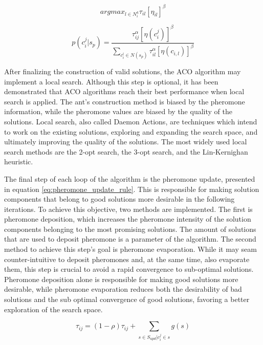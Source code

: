 \begin{equation} \label{eq:heuristic_rule}
	arg max_{l \in N_{i}^{k} } \tau_{il}[\eta_{il}]^{\beta}
\end{equation}


\begin{equation} \label{eq:ant_system_rule}
	p(c_{i}^{j}|s_{p}) = \frac{\tau_{ij}^{\alpha}  [\eta(c_{i}^{j})]^{\beta}}{\sum_{c_{i}^{l} \in N(s_{p})} \tau_{il}^{\alpha} [\eta(c_{i,l})]^{\beta}}
\end{equation}


After finalizing the construction of valid solutions, the ACO algorithm may implement a local search. Although this step is optional, it has been demonstrated that ACO algorithms reach their best performance when local search is applied. The ant's construction method is biased by the pheromone information, while the pheromone values are biased by the quality of the solutions. Local search, also called Daemon Actions, are techniques which intend to work on the existing solutions, exploring and expanding the search space, and ultimately improving the quality of the solutions. The most widely used local search methods are the 2-opt search, the 3-opt search, and the Lin-Kernighan heuristic.

The final step of each loop of the algorithm is the pheromone update, presented in equation \ref{eq:pheromone_update_rule}. This is responsible for making solution components that belong to good solutions more desirable in the following iterations. To achieve this objective, two methods are implemented. The first is pheromone deposition, which increases the pheromone intensity of the solution components belonging to the most promising solutions. The amount of solutions that are used to deposit pheromone is a parameter of the algorithm. The second method to achieve this step's goal is pheromone evaporation. While it may seam counter-intuitive to deposit pheromones and, at the same time, also evaporate them, this step is crucial to avoid a rapid convergence to sub-optimal solutions. Pheromone deposition alone is responsible for making good solutions more desirable, while pheromone evaporation reduces both the desirability of bad solutions and the sub optimal convergence of good solutions, favoring a better exploration of the search space. 

\begin{equation} \label{eq:pheromone_update_rule}
		\tau_{ij} = (1-\rho)\tau_{ij} + \sum_{s\in S_{upd}|c_{i}^{j}\in s}g(s)
\end{equation}